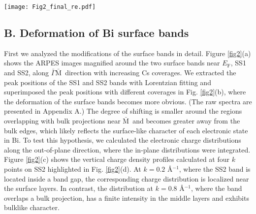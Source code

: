 \documentclass[reprint,secnumarabic,amssymb, nobibnotes, aps, prl,superscriptaddress,showpacs]{revtex4-1}
\def\mb{$\bar{\mathrm{M}}$\ }
\def\gmb{${\bar{\Gamma}}{\bar{\mathrm{M}}}$\ }
\def\EF{$E_{\mathrm{F}}$\ }
\def\EFc{$E_{\mathrm{F}}$, }
\begin{document}
\begin{figure*}
\texttt{[image: Fig2\_final\_re.pdf]}
\caption{\label{fig2}(a) ARPES images magnified near \EF along \gmb direction with increasing Cs coverage. (b) Peak positions of the SS1 and SS2 bands at each coverage extracted with Lorentzian fitting. (c) Calculated charge distributions along the out-of-plane direction at ($E, k$) points highlighted in (d). (d) Calculated band structures and surface charge densities mapped with a color scale. The grey and white solid lines in (b) and (d) depict the calculated bulk projections. (e) Comparison between wavenumber-dependence of surface charge densities calculated with several ratios and that of the SS2 band shifts between two coverages of 0.03e$^-$ and 0.06 e$^-$ per unit cell, $\Delta E_1$. Surface charge densities are superimposed with an arbitrary scale. (f) Same as (e) for the SS2 band shifts between a pristine and a 0.06 e$^-$ cases, $\Delta E_2$.}	
\end{figure*}

\subsection{B. Deformation of Bi surface bands}
First we analyzed the modifications of the surface bands in detail. Figure \ref{fig2}(a) shows the ARPES images magnified around the two surface bands near \EFc SS1 and SS2, along \gmb direction with increasing Cs coverages. We extracted the peak positions of the SS1 and SS2 bands with Lorentzian fitting and superimposed the peak positions with different coverages in Fig. \ref{fig2}(b), where the deformation of the surface bands becomes more obvious. (The raw spectra are presented in Appendix A.) The degree of shifting is smaller around the regions overlapping with bulk projections near \mb and becomes greater away from the bulk edges, which likely reflects the surface-like character of each electronic state in Bi. To test this hypothesis, we calculated the electronic charge distributions along the out-of-plane direction, where the in-plane distributions were integrated. Figure \ref{fig2}(c) shows the vertical charge density profiles calculated at four $k$ points on SS2 highlighted in Fig. \ref{fig2}(d). At $k=0.2$ \AA$^{-1}$, where the SS2 band is located inside a band gap, the corresponding charge distribution is localized near the surface layers. In contrast, the distribution at $k=0.8$ \AA$^{-1}$, where the band overlaps a bulk projection, has a finite intensity in the middle layers and exhibits bulklike character. 
\end{document}
